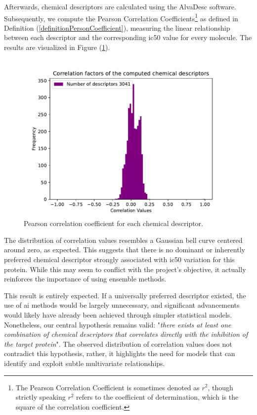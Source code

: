 \documentclass[11pt]{article}
\begin{document}
Afterwards, chemical descriptors are calculated using the AlvaDesc software. Subsequently, we compute the Pearson Correlation Coefficients\footnote{The Pearson Correlation Coefficient is sometimes denoted as $r^2$, though strictly speaking $r^2$ refers to the coefficient of determination, which is the square of the correlation coefficient.} as defined in Definition (\ref{definitionPersonCoefficient}), measuring the linear relationship between each descriptor and the corresponding \gls{ic50} value for every molecule. The results are visualized in Figure (\ref{figureGraphicCorrelationFactor}).

\begin{figure}[H]
	\centering
	\includegraphics[width = \textwidth, trim={0.6cm 0.3cm 1.5cm 1.35cm}, clip]{../Plots/ChEMBL_ExtractorData_CHEMBL230_IC50_1000CorrelationFactors.pdf}
	\caption{Pearson correlation coefficient for each chemical descriptor.}
	\label{figureGraphicCorrelationFactor}
\end{figure}

The distribution of correlation values resembles a Gaussian bell curve centered around zero, as expected. This suggests that there is no dominant or inherently preferred chemical descriptor strongly associated with \gls{ic50} variation for this protein. While this may seem to conflict with the project's objective, it actually reinforces the importance of using ensemble methods.

This result is entirely expected. If a universally preferred descriptor existed, the use of \gls{ai} methods would be largely unnecessary, and significant advancements would likely have already been achieved through simpler statistical models. Nonetheless, our central hypothesis remains valid: "\emph{there exists at least one combination of chemical descriptors that correlates directly with the inhibition of the target protein}". The observed distribution of correlation values does not contradict this hypothesis, rather, it highlights the need for models that can identify and exploit subtle multivariate relationships.
\end{document}
